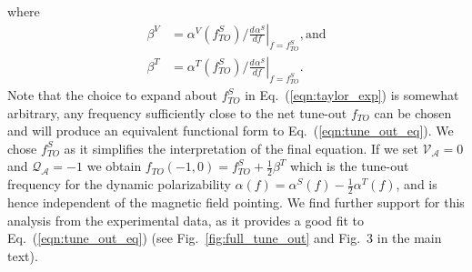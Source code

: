 \documentclass[%
 amsmath,amssymb,
aps,
]{revtex4-2}
\newcommand{\derivn}[3][{}]{
    \frac{d^{#1} #2}{d #3^{#1}}
}
\begin{document}
where
 \begin{align}
  \beta^V &= \alpha^V(f^{S}_{TO}) \bigg/ \left. \derivn{\alpha^S}{f} \right|_{f=f^{S}_{TO}} \mathrm{, and}\\
  \beta^T &= \alpha^T(f^{S}_{TO}) \bigg/ \left. \derivn{\alpha^S}{f} \right|_{f=f^{S}_{TO}} .
 \end{align}
Note that the choice to expand about \(f^{S}_{TO}\) in Eq.~(\ref{eqn:taylor_exp}) is somewhat arbitrary, any frequency sufficiently close to the net tune-out \(f_{TO}\) can be chosen and will produce an equivalent functional form to Eq.~(\ref{eqn:tune_out_eq}).  We chose \(f^{S}_{TO}\) as it simplifies the interpretation of the final equation. If we set \(\mathcal{V_{A}}=0\) and \(\mathcal{Q_{A}}=-1\) we obtain \(f_{TO}(-1,0) = f^{S}_{TO} + \frac{1}{2} \beta^T\) which is the tune-out frequency for the dynamic polarizability \(\alpha(f) = \alpha^S(f) - \frac{1}{2}  \alpha^T(f)\), and is hence independent of the magnetic field pointing. We find further support for this analysis from the experimental data, as it provides a good fit to Eq.~(\ref{eqn:tune_out_eq}) (see Fig.~\ref{fig:full_tune_out} and Fig.~3 in the main text).
  
\end{document}
